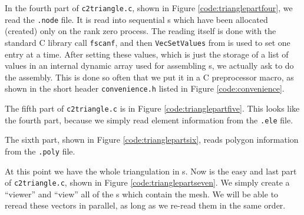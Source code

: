 
In the fourth part of \texttt{c2triangle.c}, shown in Figure \ref{code:trianglepartfour}, we read the \texttt{.node} file.  It is read into sequential \PETSc \pVec s which have been allocated (created) only on the rank zero process.  The reading itself is done with the standard C library call \texttt{fscanf}, and then \texttt{VecSetValues} from \PETSc is used to set one \pVec entry at a time.  After setting these values, which is just the storage of a list of values in an internal \PETSc dynamic array used for assembling \pVec s, we actually ask \PETSc to do the assembly.  This is done so often that we put it in a C preprocessor macro, as shown in the short header \texttt{convenience.h} listed in Figure \ref{code:convenience}.



The fifth part of \texttt{c2triangle.c} is in Figure \ref{code:trianglepartfive}.  This looks like the fourth part, because we simply read element information from the \texttt{.ele} file.


The sixth part, shown in Figure \ref{code:trianglepartsix}, reads polygon information from the \texttt{.poly} file.


At this point we have the whole triangulation in \PETSc \pVec s.  Now is the easy and last part of \texttt{c2triangle.c}, shown in Figure \ref{code:trianglepartseven}.  We simply create a \PETSc ``viewer'' and ``view'' all of the \pVec s which contain the mesh.  We will be able to reread these vectors in parallel, as long as we re-read them in the same order.




